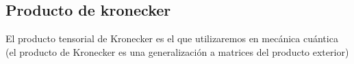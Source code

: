 \subsection{Producto de kronecker}
El producto tensorial de Kronecker es el que utilizaremos en mecánica cuántica (el producto de Kronecker es una generalización a matrices del producto exterior)



